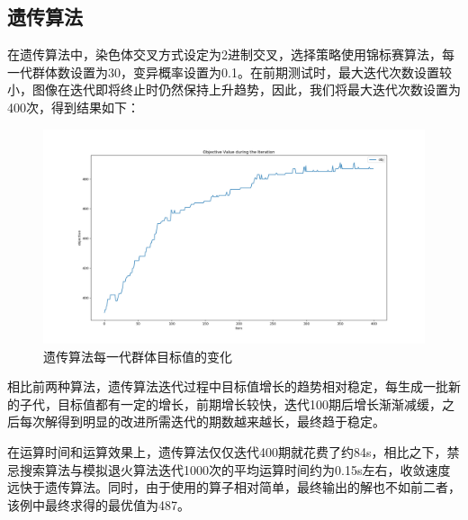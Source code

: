 \documentclass{article}
\begin{document}
    \subsection{遗传算法}
    在遗传算法中，染色体交叉方式设定为2进制交叉，选择策略使用锦标赛算法，每一代群体数设置为30，变异概率设置为0.1。在前期测试时，最大迭代次数设置较小，图像在迭代即将终止时仍然保持上升趋势，因此，我们将最大迭代次数设置为400次，得到结果如下：
    \begin{figure}[H]
        \centering
        \includegraphics[width=\textwidth]{./image/ga.png}
        \caption{遗传算法每一代群体目标值的变化}
    \end{figure}

    相比前两种算法，遗传算法迭代过程中目标值增长的趋势相对稳定，每生成一批新的子代，目标值都有一定的增长，前期增长较快，迭代100期后增长渐渐减缓，之后每次解得到明显的改进所需迭代的期数越来越长，最终趋于稳定。

    在运算时间和运算效果上，遗传算法仅仅迭代400期就花费了约84s，相比之下，禁忌搜索算法与模拟退火算法迭代1000次的平均运算时间约为0.15s左右，收敛速度远快于遗传算法。同时，由于使用的算子相对简单，最终输出的解也不如前二者，该例中最终求得的最优值为487。

    \newpage
\end{document}
